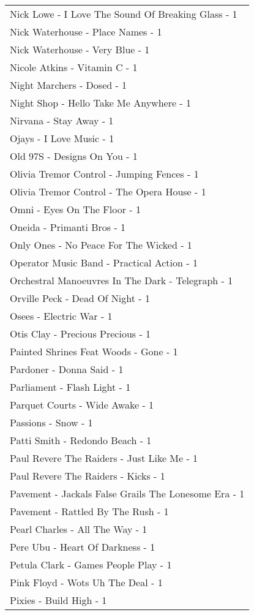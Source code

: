 \documentclass[
]{article}
\begin{document}
\begin{longtable}{l}
Nick Lowe - I Love The Sound Of Breaking Glass - 1 \\ 
Nick Waterhouse - Place Names - 1 \\ 
Nick Waterhouse - Very Blue - 1 \\ 
Nicole Atkins - Vitamin C - 1 \\ 
Night Marchers - Dosed - 1 \\ 
Night Shop - Hello Take Me Anywhere - 1 \\ 
Nirvana - Stay Away - 1 \\ 
Ojays - I Love Music - 1 \\ 
Old 97S - Designs On You - 1 \\ 
Olivia Tremor Control - Jumping Fences - 1 \\ 
Olivia Tremor Control - The Opera House - 1 \\ 
Omni - Eyes On The Floor - 1 \\ 
Oneida - Primanti Bros - 1 \\ 
Only Ones - No Peace For The Wicked - 1 \\ 
Operator Music Band - Practical Action - 1 \\ 
Orchestral Manoeuvres In The Dark - Telegraph - 1 \\ 
Orville Peck - Dead Of Night - 1 \\ 
Osees - Electric War - 1 \\ 
Otis Clay - Precious Precious - 1 \\ 
Painted Shrines Feat Woods - Gone - 1 \\ 
Pardoner - Donna Said - 1 \\ 
Parliament - Flash Light - 1 \\ 
Parquet Courts - Wide Awake - 1 \\ 
Passions - Snow - 1 \\ 
Patti Smith - Redondo Beach - 1 \\ 
Paul Revere The Raiders - Just Like Me - 1 \\ 
Paul Revere The Raiders - Kicks - 1 \\ 
Pavement - Jackals False Grails The Lonesome Era - 1 \\ 
Pavement - Rattled By The Rush - 1 \\ 
Pearl Charles - All The Way - 1 \\ 
Pere Ubu - Heart Of Darkness - 1 \\ 
Petula Clark - Games People Play - 1 \\ 
Pink Floyd - Wots Uh The Deal - 1 \\ 
Pixies - Build High - 1 \\ 

\end{longtable}
\end{document}
